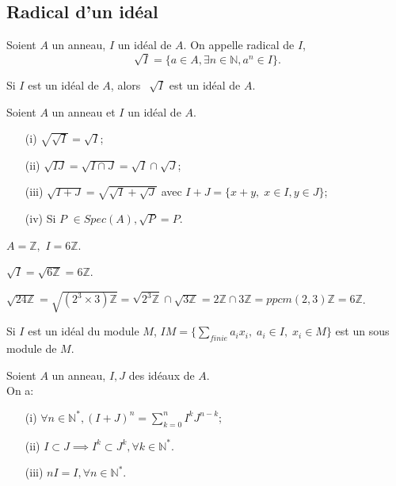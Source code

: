 \subsection{Radical d'un idéal}
\begin{madefinition}
	Soient $A$ un anneau, $I$ un idéal de $A$. On appelle radical de $I$,
	\[\sqrt[]{I} = \{ a \in A, \exists  n \in \mathbb{N}, a^n \in I \}. \]
\end{madefinition}
\begin{maremarque}
	Si $I$ est un idéal de $A$, alors $\, \sqrt[]{I}$ est un idéal de $A$.
\end{maremarque}
\begin{maproposition}
	Soient $A$ un anneau et $I$ un idéal de $A$.
	\begin{enumerate}
		\item[(i)] $\sqrt{\sqrt{I}} = \sqrt{I}$;
		\item[(ii)] $\sqrt{IJ} = \sqrt{I\cap J}=\sqrt{I}\cap \sqrt{J}$;
		\item[(iii)] $\sqrt{I+J} = \sqrt{\sqrt{I}+\sqrt{J}}$ avec $I+J = \{ x + y , \; x \in I, y \in J\}$;
		\item[(iv)] Si $P$ $\in Spec(A),\sqrt{P}=P$.
	\end{enumerate}
\end{maproposition}
\begin{monexemple}
	$A=\mathbb{Z},$ $I=6\mathbb{Z}$.
	
	$\sqrt{I}=\sqrt{6\mathbb{Z}}=6\mathbb{Z}$.
	
	$\sqrt{24\mathbb{Z}}=\sqrt{(2^{3}\times 3)\mathbb{Z}}=\sqrt{2^{3}\mathbb{Z}}\cap \sqrt{3\mathbb{Z}}=2\mathbb{Z}\cap 3\mathbb{Z}=ppcm(2,3)\mathbb{Z}=6\mathbb{Z}$.
\end{monexemple}
\begin{maremarque}
	Si $I$ est un idéal du module $M$, $IM = \{ \underset{finie}{\sum }a_{i}x_{i}, \; a_i \in I, \; x_i \in M \}$ est un sous module de $M$.
\end{maremarque}
\begin{maproposition}
	\label{maprop13}
	Soient $A$ un anneau, $I,J$ des idéaux de $A$. \\
	On a:
	\begin{enumerate}
		\item[(i)] $\forall n \in \mathbb{N}^{*}, (I+J)^n =\displaystyle \sum_{k=0}^{n} I^k J^{n-k};$
		\item[(ii)] $I \subset J \implies I^k \subset J^k , \forall k \in \mathbb{N}^*.$
		\item [(iii)] $nI=I, \forall n \in \mathbb{N}^*.$
	\end{enumerate}
\end{maproposition}
